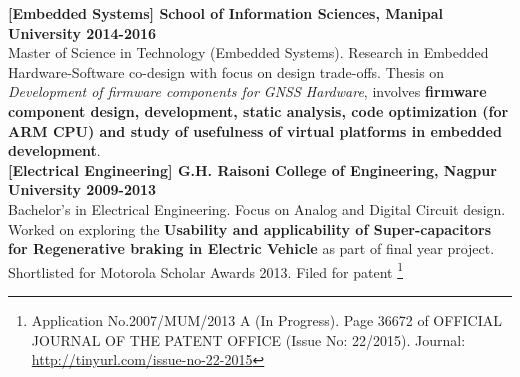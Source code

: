 
\reversemarginpar {}
\noindent \textbf{\textcolor{ultramarine}{[Embedded Systems] School of Information Sciences, Manipal University \hfill 2014-2016}
}\\
Master of Science in Technology (Embedded Systems). Research in Embedded Hardware-Software co-design with focus on design trade-offs. Thesis on \textit {Development of firmware components for GNSS Hardware}, involves \textbf{firmware component design, development, static analysis, code optimization (for ARM CPU) and study of usefulness of virtual platforms in embedded development}.\\

\noindent \textbf{\textcolor{ultramarine}{[Electrical Engineering] G.H. Raisoni College of Engineering, Nagpur University \hfill 2009-2013}
}\\
Bachelor's in Electrical Engineering. Focus on Analog and Digital Circuit design. Worked on exploring the \textbf{Usability and applicability of Super-capacitors for Regenerative braking in Electric Vehicle} as part of final year project. Shortlisted for Motorola Scholar Awards 2013. Filed for patent \footnote{Application No.2007/MUM/2013 A (In Progress). Page 36672 of OFFICIAL JOURNAL OF THE PATENT OFFICE (Issue No: 22/2015).
Journal: \url{http://tinyurl.com/issue-no-22-2015}}
\\
